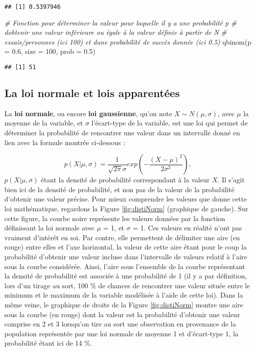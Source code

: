 \documentclass[
]{book}
\newenvironment{Shaded}{\begin{snugshade}}{\end{snugshade}}
\newcommand{\AttributeTok}[1]{\textcolor[rgb]{0.77,0.63,0.00}{#1}}
\newcommand{\CommentTok}[1]{\textcolor[rgb]{0.56,0.35,0.01}{\textit{#1}}}
\newcommand{\DecValTok}[1]{\textcolor[rgb]{0.00,0.00,0.81}{#1}}
\newcommand{\FloatTok}[1]{\textcolor[rgb]{0.00,0.00,0.81}{#1}}
\newcommand{\FunctionTok}[1]{\textcolor[rgb]{0.00,0.00,0.00}{#1}}
\newcommand{\NormalTok}[1]{#1}
\begin{document}
\begin{verbatim}
## [1] 0.5397946
\end{verbatim}

\begin{Shaded}
\begin{Highlighting}[]
\CommentTok{\# Fonction pour déterminer la valeur pour laquelle il y a une probabilité p }
\CommentTok{\# d\textquotesingle{}obtenir une valeur inférieure ou égale à la valeur définie à partir de N }
\CommentTok{\# essais/personnes (ici 100) et d\textquotesingle{}une probabilité de succès donnée (ici 0.5)}
\FunctionTok{qbinom}\NormalTok{(}\AttributeTok{p =} \FloatTok{0.6}\NormalTok{, }\AttributeTok{size =} \DecValTok{100}\NormalTok{, }\AttributeTok{prob =} \FloatTok{0.5}\NormalTok{)}
\end{Highlighting}
\end{Shaded}

\begin{verbatim}
## [1] 51
\end{verbatim}

\hypertarget{la-loi-normale-et-lois-apparentuxe9es}{%
\subsection{La loi normale et lois apparentées}\label{la-loi-normale-et-lois-apparentuxe9es}}

La \textbf{loi normale}, ou encore \textbf{loi gaussienne}, qu'on note \(X \sim N(\mu, \sigma)\), avec \(\mu\) la moyenne de la variable, et \(\sigma\) l'écart-type de la variable, est une loi qui permet de déterminer la probabilité de rencontrer une valeur dans un intervalle donné en lien avec la formule montrée ci-dessous :

\[p(X | \mu, \sigma) = \frac{1}{\sqrt{2\pi}\sigma} exp(-\frac{(X-\mu)^2}{2\sigma^2}),\]
\(p(X | \mu, \sigma)\) étant la densité de probabilité correspondant à la valeur \(X\). Il s'agit bien ici de la densité de probabilité, et non pas de la valeur de la probabilité d'obtenir une valeur précise. Pour mieux comprendre les valeurs que donne cette loi mathématique, regardons la Figure \ref{fig:distiNorm} (graphique de gauche). Sur cette figure, la courbe noire représente les valeurs données par la fonction définissant la loi normale avec \(\mu\) = 1, et \(\sigma\) = 1. Ces valeurs en réalité n'ont pas vraiment d'intérêt en soi. Par contre, elle permettent de délimiter une aire (en rouge) entre elles et l'axe horizontal, la valeur de cette aire étant pour le coup la probabilité d'obtenir une valeur incluse dans l'intervalle de valeurs relatif à l'aire sous la courbe considérée. Ainsi, l'aire sous l'ensemble de la courbe représentant la densité de probabilité est associée à une probabilité de 1 (il y a par définition, lors d'un tirage au sort, 100 \% de chances de rencontrer une valeur située entre le minimum et le maximum de la variable modélisée à l'aide de cette loi). Dans la même veine, le graphique de droite de la Figure \ref{fig:distiNorm} montre une aire sous la courbe (en rouge) dont la valeur est la probabilité d'obtenir une valeur comprise en 2 et 3 lorsqu'on tire au sort une observation en provenance de la population représentée par une loi normale de moyenne 1 et d'écart-type 1, la probabilité étant ici de 14 \%.
\end{document}
